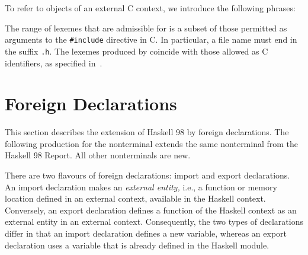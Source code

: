 \documentclass[a4paper,twoside]{article}
\newcommand{\code}[1]{\texttt{#1}}      %
\begin{document}
To refer to objects of an external C context, we introduce the following
phrases:
%
\begin{grammar}
\end{grammar}
%
The range of lexemes that are admissible for  is a subset of
those permitted as arguments to the \code{\#{}include} directive in C.  In
particular, a file name  must end in the suffix \code{.h}.  The
lexemes produced by  coincide with those allowed as C identifiers,
as specified in~\cite{C}.

\newpage
\section{Foreign Declarations}

This section describes the extension of Haskell 98 by foreign declarations.
The following production for the nonterminal  extends the same
nonterminal from the Haskell 98 Report.  All other nonterminals are new.
%
\begin{grammar}
\end{grammar}
%
There are two flavours of foreign declarations: import and export
declarations.  An import declaration makes an \emph{external entity,} i.e., a
function or memory location defined in an external context, available in the
Haskell context.  Conversely, an export declaration defines a function of the
Haskell context as an external entity in an external context.  Consequently,
the two types of declarations differ in that an import declaration defines a
new variable, whereas an export declaration uses a variable that is already
defined in the Haskell module.
\end{document}
